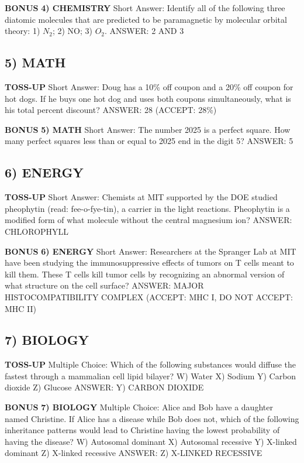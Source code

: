 \documentclass{article}
\begin{document}
\textbf{BONUS}
\textbf{4) CHEMISTRY}
Short Answer: Identify all of the following three diatomic molecules that are predicted to be paramagnetic by molecular orbital theory: 1) $N_{2}$; 2) NO; 3) $O_{2}$.
ANSWER: 2 AND 3

\subsection*{5) MATH}
\textbf{TOSS-UP}
Short Answer: Doug has a 10\% off coupon and a 20\% off coupon for hot dogs. If he buys one hot dog and uses both coupons simultaneously, what is his total percent discount?
ANSWER: 28 (ACCEPT: 28\%)

\textbf{BONUS}
\textbf{5) MATH}
Short Answer: The number 2025 is a perfect square. How many perfect squares less than or equal to 2025 end in the digit 5?
ANSWER: 5

\subsection*{6) ENERGY}
\textbf{TOSS-UP}
Short Answer: Chemists at MIT supported by the DOE studied pheophytin (read: fee-o-fye-tin), a carrier in the light reactions. Pheophytin is a modified form of what molecule without the central magnesium ion?
ANSWER: CHLOROPHYLL

\textbf{BONUS}
\textbf{6) ENERGY}
Short Answer: Researchers at the Spranger Lab at MIT have been studying the immunosuppressive effects of tumors on T cells meant to kill them. These T cells kill tumor cells by recognizing an abnormal version of what structure on the cell surface?
ANSWER: MAJOR HISTOCOMPATIBILITY COMPLEX (ACCEPT: MHC I, DO NOT ACCEPT: MHC II)

\subsection*{7) BIOLOGY}
\textbf{TOSS-UP}
Multiple Choice: Which of the following substances would diffuse the fastest through a mammalian cell lipid bilayer?
W) Water
X) Sodium
Y) Carbon dioxide
Z) Glucose
ANSWER: Y) CARBON DIOXIDE

\textbf{BONUS}
\textbf{7) BIOLOGY}
Multiple Choice: Alice and Bob have a daughter named Christine. If Alice has a disease while Bob does not, which of the following inheritance patterns would lead to Christine having the lowest probability of having the disease?
W) Autosomal dominant
X) Autosomal recessive
Y) X-linked dominant
Z) X-linked recessive
ANSWER: Z) X-LINKED RECESSIVE
\end{document}
